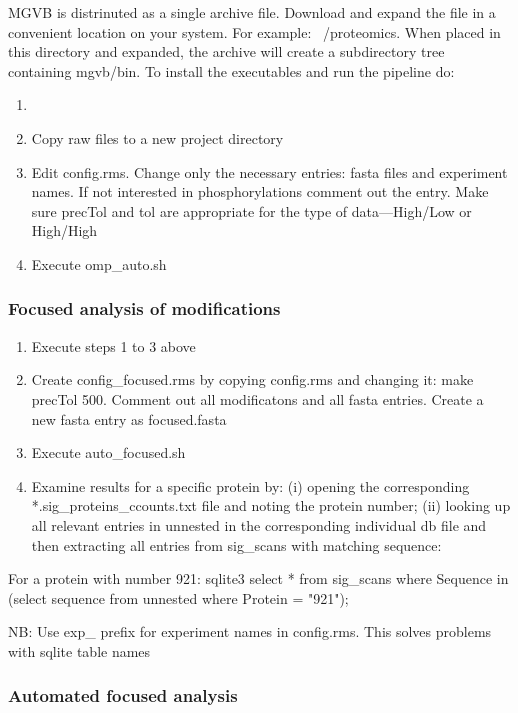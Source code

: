 \documentclass[sn-standardnature]{sn-jnl}%
\theoremstyle{thmstyleone}%
\theoremstyle{thmstyletwo}%
\theoremstyle{thmstylethree}%
\begin{document}
MGVB is distrinuted as a single archive file. Download and expand the file in a convenient location on your system. For example: ~/proteomics.
When placed in this directory and expanded, the archive will create a subdirectory tree containing mgvb/bin. To install the executables and run the pipeline do:
\begin {enumerate}
\item {}
\item {Copy raw files to a new project directory}
\item {Edit config.rms. Change only the necessary entries: fasta files and experiment names. If not interested in phosphorylations comment out the entry. Make sure precTol and tol are appropriate for the type of data—High/Low or High/High}
\item {Execute omp\_auto.sh}
\end {enumerate}

\subsubsection {Focused analysis of modifications}
\begin {enumerate}
\item {Execute steps 1 to 3 above}
\item {Create config\_focused.rms by copying config.rms and changing it: make precTol 500. Comment out all modificatons and all fasta entries. Create a new fasta entry as focused.fasta}
\item {Execute auto\_focused.sh}
\item {Examine results for a specific protein by: (i) opening the corresponding *.sig\_proteins\_ccounts.txt file and noting the protein number; (ii) looking up all relevant entries in unnested in the corresponding individual db file and then extracting all entries from sig\_scans with matching sequence:}
\end {enumerate}

       For a protein with number 921:
       sqlite3 select * from sig\_scans where Sequence in (select sequence from unnested where Protein = "921");

NB: Use exp\_ prefix for experiment names in config.rms. This solves problems with sqlite table names

\subsubsection {Automated focused analysis} \label {subsubsect2}
\end{document}
